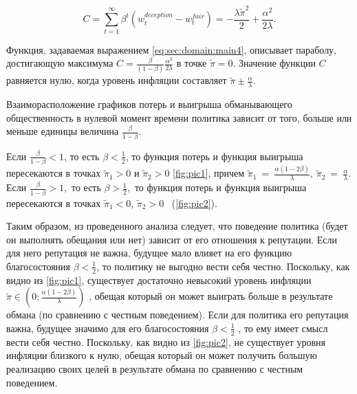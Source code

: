 \begin{equation}
	\label{eq:sec:domain:main4}
C=\sum_{t=1}^{\infty} \beta^t(w^{deception}_t - w^{fair}_t) = -\frac{\lambda\tilde{\pi}^2}{2}+\frac{\alpha^2}{2\lambda}.
\end{equation}



Функция, задаваемая выражением \eqref{eq:sec:domain:main4}, описывает параболу,
достигающую максимума $C=\frac{\beta}{(1-\beta)}\frac{\alpha^2}{2\lambda} $  в
точке   $\tilde{\pi}=0$. Значение функции $C$ равняется нулю, когда уровень
инфляции составляет $\tilde{\pi}\pm\frac{\alpha}{\lambda}$.


Взаиморасположение графиков потерь и выигрыша обманывающего общественность в нулевой момент времени политика зависит от того, больше или меньше единицы величина $\frac{\beta}{1-\beta}$.

Если   $\frac{\beta}{1-\beta}<1$, то есть  $\beta<\frac{1}{2}$, то функция потерь и функция выигрыша пересекаются в точках  $\tilde{\pi}_1>0$ и $\tilde{\pi}_2>0$ \eqref{fig:pic1}, причем  $\tilde{\pi}_1~=~\frac{\alpha(1-2\beta)}{\lambda}$, $\tilde{\pi}_2~=~\frac{\alpha}{\lambda}$. \\
Если  $\frac{\beta}{1-\beta}>1,$  то есть  $\beta>\frac{1}{2},$  то функция потерь и функция выигрыша пересекаются в точках   $\tilde{\pi}_1<0$, $\tilde{\pi}_2>0$ ~(\ref{fig:pic2}).

Таким образом, из проведенного анализа следует, что поведение политика (будет он выполнять обещания или нет) зависит от его отношения к репутации. Если для него репутация не важна, будущее мало влияет на его функцию благосостояния $\beta<\frac{1}{2}$, то политику не выгодно вести себя честно. Поскольку, как видно из \eqref{fig:pic1}, существует достаточно невысокий уровень инфляции $\tilde{\pi}\in\left(0;\frac{\alpha(1-2\beta)}{\lambda} \right)$ , обещая который он может выиграть больше в результате обмана (по сравнению с честным поведением). Если для политика его репутация важна, будущее значимо для его благосостояния $\beta<\frac{1}{2}$ , то ему имеет смысл вести себя честно. Поскольку, как видно из \eqref{fig:pic2}, не существует уровня инфляции близкого к нулю, обещая который он может получить большую реализацию своих целей в результате обмана по сравнению с честным поведением.
